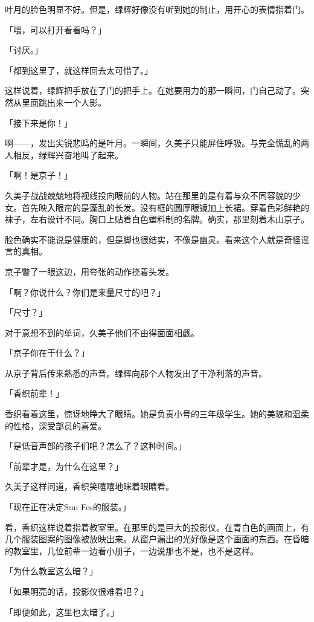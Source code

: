 \documentclass[UTF8]{ctexart}
\begin{document}
    叶月的脸色明显不好。但是，绿辉好像没有听到她的制止，用开心的表情指着门。

    「喂，可以打开看看吗？」

    「讨厌。」

    「都到这里了，就这样回去太可惜了。」

    这样说着，绿辉把手放在了门的把手上。在她要用力的那一瞬间，门自己动了。突然从里面跳出来一个人影。

    「接下来是你！」

    啊——，发出尖锐悲鸣的是叶月。一瞬间，久美子只能屏住呼吸。与完全慌乱的两人相反，绿辉兴奋地叫了起来。

    「啊！是京子！」

    久美子战战兢兢地将视线投向眼前的人物。站在那里的是有着与众不同容貌的少女。首先映入眼帘的是蓬乱的长发。没有框的圆厚眼镜加上长裙。穿着色彩鲜艳的袜子，左右设计不同。胸口上贴着白色塑料制的名牌。确实，那里刻着木山京子。

    脸色确实不能说是健康的，但是脚也很结实，不像是幽灵。看来这个人就是奇怪谣言的真相。

    京子瞥了一眼这边，用夸张的动作挠着头发。

    「啊？你说什么？你们是来量尺寸的吧？」

    「尺寸？」

    对于意想不到的单词，久美子他们不由得面面相觑。

    「京子你在干什么？」

    从京子背后传来熟悉的声音。绿辉向那个人物发出了干净利落的声音。

    「香织前辈！」

    香织看着这里，惊讶地睁大了眼睛。她是负责小号的三年级学生。她的美貌和温柔的性格，深受部员的喜爱。

    「是低音声部的孩子们吧？怎么了？这种时间。」

    「前辈才是，为什么在这里？」

    久美子这样问道，香织笑嘻嘻地眯着眼睛看。

    「现在正在决定Sun Fes的服装。」

    看，香织这样说着指着教室里。在那里的是巨大的投影仪。在青白色的画面上，有几个服装图案的图像被放映出来。从窗户漏出的光好像是这个画面的东西。在昏暗的教室里，几位前辈一边看小册子，一边说那也不是，也不是这样。

    「为什么教室这么暗？」

    「如果明亮的话，投影仪很难看吧？」

    「即便如此，这里也太暗了。」
\end{document}
